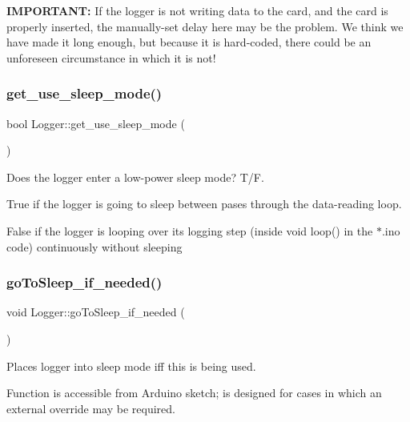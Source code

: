 {\bfseries I\+M\+P\+O\+R\+T\+A\+NT\+:} If the logger is not writing data to the card, and the card is properly inserted, the manually-\/set delay here may be the problem. We think we have made it long enough, but because it is hard-\/coded, there could be an unforeseen circumstance in which it is not!\mbox{\label{classLogger_acc758b6fdaac8099c492929aa7f1691d}} 
\subsubsection{\texorpdfstring{get\+\_\+use\+\_\+sleep\+\_\+mode()}{get\_use\_sleep\_mode()}}
{\footnotesize\ttfamily bool Logger\+::get\+\_\+use\+\_\+sleep\+\_\+mode (\begin{DoxyParamCaption}{ }\end{DoxyParamCaption})}

Does the logger enter a low-\/power sleep mode? T/F.


\begin{DoxyItemize}
\item True if the logger is going to sleep between pases through the data-\/reading loop.
\item False if the logger is looping over its logging step (inside void loop() in the $\ast$.ino code) continuously without sleeping
\end{DoxyItemize}\mbox{\label{classLogger_ad28cf6450ada04f0e1475998bede5b88}} 
\subsubsection{\texorpdfstring{go\+To\+Sleep\+\_\+if\+\_\+needed()}{goToSleep\_if\_needed()}}
{\footnotesize\ttfamily void Logger\+::go\+To\+Sleep\+\_\+if\+\_\+needed (\begin{DoxyParamCaption}{ }\end{DoxyParamCaption})}

Places logger into sleep mode iff this is being used.

Function is accessible from Arduino sketch; is designed for cases in which an external override may be required.\mbox{\label{classLogger_a923b296832bd4222da649ebc66427ac1}} 
